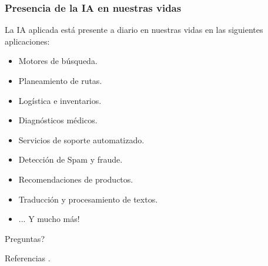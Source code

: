 \documentclass[10pt]{beamer}
\newcommand{\themename}{\textbf{\textsc{metropolis}}\xspace}
\begin{document}
\begin{frame}
    \frametitle{Presencia de la IA en nuestras vidas}
    La IA aplicada está presente a diario en nuestras vidas en las siguientes aplicaciones:

    \begin{itemize}
        \item Motores de búsqueda.
        \item Planeamiento de rutas.
        \item Logística e inventarios.
        \item Diagnósticos médicos.
        \item Servicios de soporte automatizado.
        \item Detección de Spam y fraude.
        \item Recomendaciones de productos.
        \item Traducción y procesamiento de textos.
        \pause
        \item ... Y mucho más!
    \end{itemize}
\end{frame}


{
\begin{frame}[standout]
  Preguntas?
\end{frame}
}

\appendix




\begin{frame}[allowframebreaks]{Referencias}
.
\end{frame}
\end{document}
